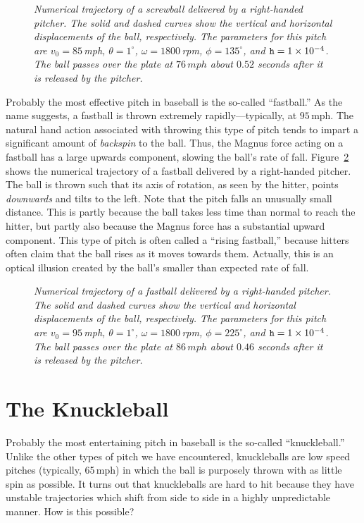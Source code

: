 \begin{figure}
\epsfysize=3.5in
\centerline{}
\caption{\em Numerical trajectory of a screwball delivered by a
right-handed pitcher. The solid and dashed curves show the vertical
and horizontal displacements of the ball, respectively. The
parameters for this pitch are $v_0=85$\,mph, $\theta = 1^\circ$, $\omega
=1800$\,rpm, $\phi = 135^\circ$, and ${\tt h}=1\times 10^{-4}$. 
The ball passes over the plate at $76\,mph$ about $0.52$ seconds after
it is released by the pitcher.}\label{fscrew}
\end{figure}

Probably the most effective pitch in baseball is the so-called ``fastball.''\@
As the name suggests, a fastball is thrown extremely rapidly---typically,
at $95\,$mph. The natural hand action associated with throwing this
type of pitch tends to impart a significant amount of {\em backspin}\/ to the
ball. Thus, the Magnus force acting on a fastball  has a large
upwards component, slowing the ball's rate of fall.
 Figure~\ref{ffast} shows the  numerical trajectory of a fastball delivered
by a right-handed pitcher. The ball is thrown such that its
axis of rotation, as seen by the hitter,
 points {\em  downwards}\/ and tilts to the  left. 
Note that the pitch falls an unusually small distance. This is partly because the ball takes
less time than normal to reach the hitter, but partly also because the Magnus force has a
substantial upward component. This type of pitch is often called
a ``rising fastball,'' because hitters often claim that the ball rises
as it moves towards them. Actually, this is
an optical illusion created by the ball's smaller than expected rate of fall.

\begin{figure}
\epsfysize=3.5in
\centerline{}
\caption{\em Numerical trajectory of a fastball delivered by a
right-handed pitcher. The solid and dashed curves show the vertical
and horizontal displacements of the ball, respectively. The
parameters for this pitch are $v_0=95$\,mph, $\theta = 1^\circ$, $\omega
=1800$\,rpm, $\phi = 225^\circ$, and ${\tt h}=1\times 10^{-4}$. 
The ball passes over the plate at $86\,mph$ about $0.46$ seconds after
it is released by the pitcher.}\label{ffast}
\end{figure}

\section{The Knuckleball}
Probably the most entertaining pitch in baseball is  the so-called  ``knuckleball.''\@
Unlike the other types of pitch we have encountered, knuckleballs are low
speed pitches (typically, 65\,mph) in which the ball is purposely
thrown with as little spin as possible. It turns out that knuckleballs are hard to
hit because they have unstable trajectories which shift from side to
side in a highly unpredictable manner. How is this possible?


